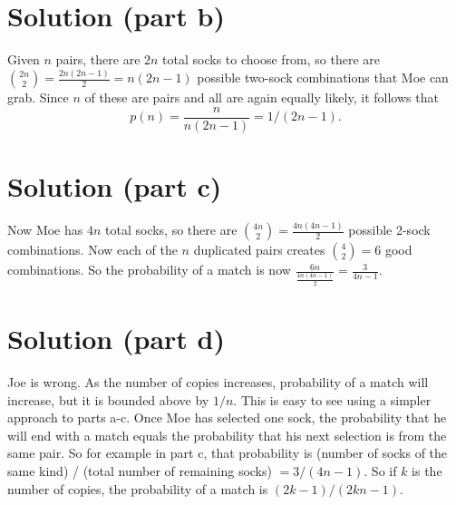 \documentclass[11pt,a4paper]{report}
\theoremstyle{plain}
\theoremstyle{definition}
\theoremstyle{remark}
\begin{document}
\section*{Solution (part b)}
Given $n$ pairs, there are $2n$ total socks to choose from, so there are ${2n \choose 2} = \frac{2n(2n - 1)}{2} = n(2n - 1)$ possible two-sock combinations that Moe can grab.  Since $n$ of these are pairs and all are again equally likely, it follows that $$p(n) = \frac{n}{n(2n - 1)} = 1 / (2n - 1).$$

\section*{Solution (part c)}
Now Moe has $4n$ total socks, so there are ${4n \choose 2} = \frac{4n(4n - 1)}{2}$ possible 2-sock combinations.  Now each of the $n$ duplicated pairs creates ${4 \choose 2} = 6$ good combinations.  So the probability of a match is now $\frac{6n}{\frac{4n(4n - 1)}{2}} = \frac{3}{4n - 1}.$

\section*{Solution (part d)}
Joe is wrong. As the number of copies increases, probability of a match will increase, but it is bounded above by $1/n.$  This is easy to see using a simpler approach to parts a-c. Once Moe has selected one sock, the probability that he will end with a match equals the probability that his next selection is from the same pair. So for example in part c, that probability is (number of socks of the same kind) / (total number of remaining socks) $= 3/(4n-1)$.  So if $k$ is the number of copies, the probability of a match is $(2k - 1) / (2kn - 1).$
 
\end{document}
